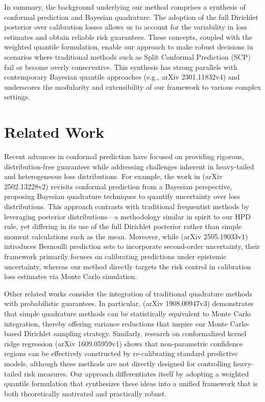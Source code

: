 \documentclass{article}
\begin{document}
In summary, the background underlying our method comprises a synthesis of conformal prediction and Bayesian quadrature. The adoption of the full Dirichlet posterior over calibration losses allows us to account for the variability in loss estimates and obtain reliable risk guarantees. These concepts, coupled with the weighted quantile formulation, enable our approach to make robust decisions in scenarios where traditional methods such as Split Conformal Prediction (SCP) fail or become overly conservative. This synthesis has strong parallels with contemporary Bayesian quantile approaches (e.g., arXiv 2301.11832v4) and underscores the modularity and extensibility of our framework to various complex settings.

\section{Related Work}
Recent advances in conformal prediction have focused on providing rigorous, distribution‐free guarantees while addressing challenges inherent in heavy-tailed and heterogeneous loss distributions. For example, the work in (arXiv 2502.13228v2) revisits conformal prediction from a Bayesian perspective, proposing Bayesian quadrature techniques to quantify uncertainty over loss distributions. This approach contrasts with traditional frequentist methods by leveraging posterior distributions—a methodology similar in spirit to our HPD rule, yet differing in its use of the full Dirichlet posterior rather than simple moment calculations such as the mean. Moreover, while (arXiv 2505.19033v1) introduces Bernoulli prediction sets to incorporate second-order uncertainty, their framework primarily focuses on calibrating predictions under epistemic uncertainty, whereas our method directly targets the risk control in calibration loss estimates via Monte Carlo simulation.

Other related works consider the integration of traditional quadrature methods with probabilistic guarantees. In particular, (arXiv 1908.00947v3) demonstrates that simple quadrature methods can be statistically equivalent to Monte Carlo integration, thereby offering variance reductions that inspire our Monte Carlo-based Dirichlet sampling strategy. Similarly, research on conformalized kernel ridge regression (arXiv 1609.05959v1) shows that non-parametric confidence regions can be effectively constructed by re-calibrating standard predictive models, although these methods are not directly designed for controlling heavy-tailed risk measures. Our approach differentiates itself by adopting a weighted quantile formulation that synthesizes these ideas into a unified framework that is both theoretically motivated and practically robust.
\end{document}
